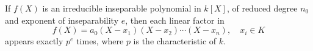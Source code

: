 If $f(X)$ is an irreducible inseparable polynomial in $k[X]$, of reduced degree $n_0$ and exponent of inseparability $e$, then each linear factor in
$$f(X) = a_0(X - x_1)(X - x_2) \cdots (X - x_n), \quad x_i \in K$$
appears exactly $p^e$ times, where $p$ is the characteristic of $k$.
